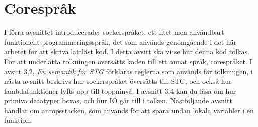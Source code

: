 \documentclass[Rapport]{subfiles}
\begin{document}
\section{Corespråk}


I förra avsnittet introducerades sockerspråket, ett litet men användbart
funktionellt programmeringsspråk, det som används genomgående i det här
arbetet för att skriva lättläst kod.
    I detta avsitt ska vi se hur denna kod tolkas. För att underlätta
tolkningen översätts koden till ett annat språk, corespråket. I avsitt
3.2, \emph{En semantik för STG} förklaras reglerna som används för
tolkningen, i nästa avsnitt beskrivs hur sockerspråket översätts
till STG, och också hur lambdafunktioner lyfts upp till toppninvå.
I avsnitt 3.4 kan du läsa om hur primiva datatyper boxas, och hur IO
går till i tolken. Nästföljande avsnitt handlar om anropsstacken, som
används för att spara undan lokala variabler i en funktion.



% 








\end{document}
